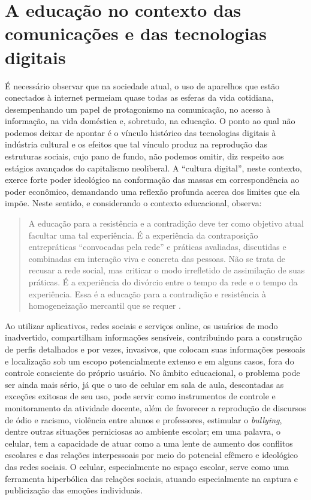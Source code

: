 \documentclass[portuguese]{textolivre}
\begin{document}
\section{A educação no contexto das comunicações e das tecnologias digitais}\label{sec-normas}
É necessário observar que na sociedade atual, o uso de aparelhos que estão conectados à internet permeiam quase todas as esferas da vida cotidiana, desempenhando um papel de protagonismo na comunicação, no acesso à informação, na vida doméstica e, sobretudo, na educação. O ponto ao qual não podemos deixar de apontar é o vínculo histórico das tecnologias digitais à indústria cultural e os efeitos que tal vínculo produz na reprodução das estruturas sociais, cujo pano de fundo, não podemos omitir, diz respeito aos estágios avançados do capitalismo neoliberal. A “cultura digital”, neste contexto, exerce forte poder ideológico na conformação das massas em correspondência ao poder econômico, demandando uma reflexão profunda acerca dos limites que ela impõe. Neste sentido, e considerando o contexto educacional, \textcite{maar_educacao_2014} observa:

\begin{quote}
    A educação para a resistência e a contradição deve ter como objetivo atual facultar uma tal experiência. É a experiência da contraposição entrepráticas “convocadas pela rede” e práticas avaliadas, discutidas e combinadas em interação viva e concreta das pessoas. Não se trata de recusar a rede social, mas criticar o modo irrefletido de assimilação de suas práticas. É a experiência do divórcio entre o tempo da rede e o tempo da experiência. Essa é a educação para a contradição e resistência à homogeneização mercantil que se requer \cite[p. 350]{maar_educacao_2014}.
\end{quote}


Ao utilizar aplicativos, redes sociais e serviços online, os usuários de modo inadvertido, compartilham informações sensíveis, contribuindo para a construção de perfis detalhados e por vezes, invasivos, que colocam suas informações pessoais e localização sob um escopo potencialmente extenso e em alguns casos, fora do controle consciente do próprio usuário. No âmbito educacional, o problema pode ser ainda mais sério, já que o uso de celular em sala de aula, descontadas as exceções exitosas de seu uso, pode servir como instrumentos de controle e monitoramento da atividade docente, além de favorecer a reprodução de discursos de ódio e racismo, violência entre alunos e professores, estimular o \textit{bullying}, dentre outras situações perniciosas ao ambiente escolar; em uma palavra, o celular, tem a capacidade de atuar como a uma lente de aumento dos conflitos escolares e das relações interpessoais por meio do potencial efêmero e ideológico das redes sociais. O celular, especialmente no espaço escolar, serve como uma ferramenta hiperbólica das relações sociais, atuando especialmente na captura e publicização das emoções individuais.
\end{document}

